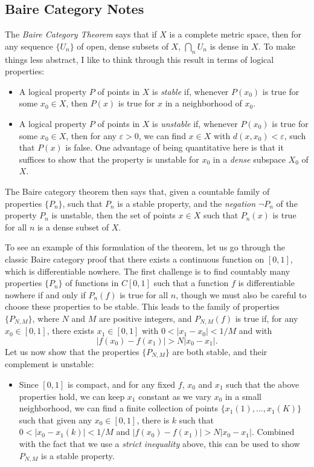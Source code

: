 \documentclass[answers]{exam}
\theoremstyle{problemstyle}
\newcommand{\1}[1]{\textbf{1}_{\left[#1\right]}} %
\begin{document}
\begin{questions}
\newpage
\section{Baire Category Notes}

The \emph{Baire Category Theorem} says that if $X$ is a complete metric space, then for any sequence $\{ U_n \}$ of open, dense subsets of $X$, $\bigcap_n U_n$ is dense in $X$. To make things less abstract, I like to think through this result in terms of logical properties:
%
\begin{itemize}
	\item A logical property $P$ of points in $X$ is \emph{stable} if, whenever $P(x_0)$ is true for some $x_0 \in X$, then $P(x)$ is true for $x$ in a neighborhood of $x_0$.

	\item A logical property $P$ of points in $X$ is \emph{unstable} if, whenever $P(x_0)$ is true for some $x_0 \in X$, then for any $\varepsilon > 0$, we can find $x \in X$ with $d(x,x_0) < \varepsilon$, such that $P(x)$ is false. One advantage of being quantitative here is that it suffices to show that the property is unstable for $x_0$ in a \emph{dense} subspace $X_0$ of $X$.
\end{itemize}
%
The Baire category theorem then says that, given a countable family of properties $\{ P_n \}$, such that $P_n$ is a stable property, and the \emph{negation} $\neg P_n$ of the property $P_n$ is unstable, then the set of points $x \in X$ such that $P_n(x)$ is true for all $n$ is a dense subset of $X$.

To see an example of this formulation of the theorem, let us go through the classic Baire category proof that there exists a continuous function on $[0,1]$, which is differentiable nowhere. The first challenge is to find countably many properties $\{ P_n \}$ of functions in $C[0,1]$ such that a function $f$ is differentiable nowhere if and only if $P_n(f)$ is true for all $n$, though we must also be careful to choose these properties to be stable. This leads to the family of properties $\{ P_{N,M} \}$, where $N$ and $M$ are positive integers, and $P_{N,M}(f)$ is true if, for any $x_0 \in [0,1]$, there exists $x_1 \in [0,1]$ with $0 < |x_1 - x_0| < 1/M$ and with
%
\[ |f(x_0) - f(x_1)| > N|x_0 - x_1|. \]
%
Let us now show that the properties $\{ P_{N,M} \}$ are both stable, and their complement is unstable:
%
\begin{itemize}
	\item Since $[0,1]$ is compact, and for any fixed $f$, $x_0$ and $x_1$ such that the above properties hold, we can keep $x_1$ constant as we vary $x_0$ in a small neighborhood, we can find a finite collection of points $\{ x_1(1),\dots, x_1(K) \}$ such that given any $x_0 \in [0,1]$, there is $k$ such that $0 < |x_0 - x_1(k)| < 1/M$ and $|f(x_0) - f(x_1)| > N|x_0 - x_1|$. Combined with the fact that we use a \emph{strict inequality} above, this can be used to show $P_{N,M}$ is a stable property.


\end{itemize}
\end{questions}
\end{document}
